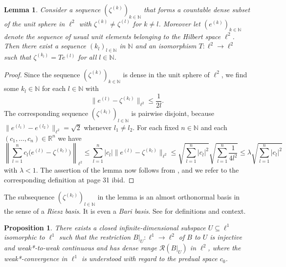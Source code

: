 \documentclass[12pt,twoside,reqno]{amsart}
\newtheorem{lemma}[theorem]{Lemma}
\newtheorem{proposition}[theorem]{Proposition}
\theoremstyle{definition}
\numberwithin{equation}{section}
\begin{document}
\begin{lemma}\label{lem:riesz_basis}
Consider a sequence $(\zeta^{(k)})_{k\in\mathbb{N}}$ that forms a countable dense subset of the unit sphere in $\ell^2$ with $\zeta^{(k)}\neq\zeta^{(l)}$ for $k\neq l$. Moreover let $(e^{(k)})_{k\in\mathbb{N}}$ denote the sequence of usual unit elements belonging to the Hilbert space $\ell^2$. Then there exist a sequence $(k_l)_{l\in\mathbb{N}}$ in $\mathbb{N}$ and an isomorphism $T:\ell^2\to\ell^2$ such that $\zeta^{(k_l)}=Te^{(l)}$ for all $l\in\mathbb{N}$.
\end{lemma}

\begin{proof}
Since the sequence $(\zeta^{(k)})_{k\in\mathbb{N}}$ is dense in the unit sphere of $\ell^2$, we find some $k_l \in \mathbb{N}$ for each $l\in \mathbb{N}$ with
\begin{equation} \label{eq:close}
\|e^{(l)}-\zeta^{(k_l)}\|_{\ell^2}\leq\frac{1}{2l}.
\end{equation}
The corresponding sequence $(\zeta^{(k_l)})_{l\in \mathbb{N}}$ is pairwise disjoint, because $\|e^{(l_1)}-e^{(l_2)}\|_{\ell^2}=\sqrt{2}$ whenever $l_1 \not=l_2$. For each fixed $n\in\mathbb{N}$ and each $(c_1,\ldots,c_n)\in\mathbb{R}^n$ we have
\begin{equation}
\left\|\sum_{l=1}^n c_l\bigl(e^{(l)}-\zeta^{(k_l)}\bigr)\right\|_{\ell^2}
\leq\sum_{l=1}^n |c_l|\bigl\|e^{(l)}-\zeta^{(k_l)}\bigr\|_{\ell^2}
\leq\sqrt{\sum_{l=1}^n|c_l|^2}\sqrt{\sum_{l=1}^n\frac{1}{4l^2}}
\leq\lambda\sqrt{\sum_{l=1}^n|c_l|^2}
\end{equation}
with $\lambda<1$. The assertion of the lemma now follows from \cite[Thm.~13, page~41]{You80}, and we refer to the corresponding definition at page 31 ibid.
\end{proof}

\pagebreak

The subsequence $(\zeta^{(k_l)})_{l\in\mathbb{N}}$ in the lemma is an almost orthonormal basis in the sense of a \emph{Riesz basis}. It is even a \emph{Bari basis}. See \cite{You80} for definitions and context.

\begin{proposition} \label{pro:BU}
There exists a closed infinite-dimensional subspace $U\subseteq\ell^1$ isomorphic to $\ell^1$ such that the restriction $B|_U:\ell^1 \to \ell^2$ of $B$ to $U$ is injective and weak*-to-weak continuous and has dense range $\mathcal{R}(B|_U)$ in $\ell^2$, where the weak*-convergence in $\ell^1$ is understood with regard to the predual space $c_0$.
\end{proposition}
\end{document}
